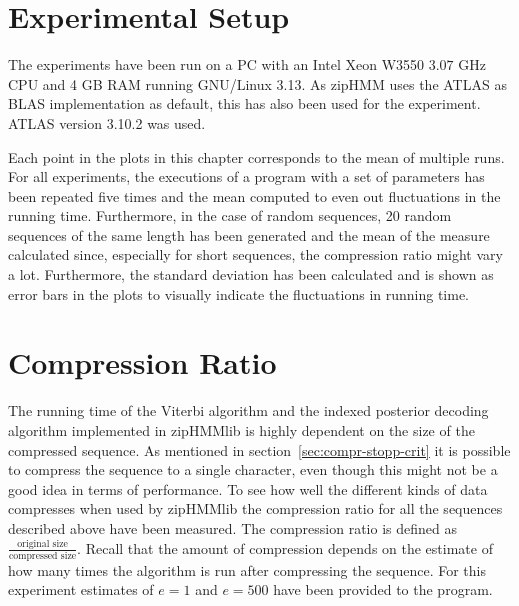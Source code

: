 \section{Experimental Setup}

The experiments have been run on a PC with an Intel Xeon W3550 $3.07$ GHz CPU
and 4 GB RAM running GNU/Linux 3.13. As zipHMM uses the ATLAS as BLAS
implementation as default, this has also been used for the experiment. ATLAS
version 3.10.2 was used.

Each point in the plots in this chapter corresponds to the mean of multiple
runs. For all experiments, the executions of a program with a set of parameters
has been repeated five times and the mean computed to even out fluctuations in
the running time. Furthermore, in the case of random sequences, 20 random
sequences of the same length has been generated and the mean of the measure
calculated since, especially for short sequences, the compression ratio might vary
a lot. Furthermore, the standard deviation has been calculated and is shown as
error bars in the plots to visually indicate the fluctuations in running time.



\section{Compression Ratio}
\label{sec:compression-ratio}

The running time of the Viterbi algorithm and the indexed posterior decoding
algorithm implemented in zipHMMlib is highly dependent on the size of the
compressed sequence. As mentioned in section~\ref{sec:compr-stopp-crit} it is
possible to compress the sequence to a single character, even though this might
not be a good idea in terms of performance. To see how well the different kinds
of data compresses when used by zipHMMlib the compression ratio for all the
sequences described above have been measured. The compression ratio is defined
as $\frac{\text{original size}}{\text{compressed size}}$. Recall that the
amount of compression depends on the estimate of how many times the algorithm
is run after compressing the sequence. For this experiment estimates of
$e = 1$ and $e = 500$ have been provided to the program.

